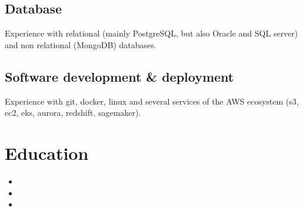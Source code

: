 \documentclass[11pt,a4paper,sans]{moderncv}        %
\begin{document}
\subsection{Database}
Experience with relational (mainly PostgreSQL, but also Oracle and SQL server) and non relational (MongoDB) databases.
\subsection{Software development \& deployment}
Experience with git, docker, linux and several services of the AWS ecosystem (s3, ec2, eks, aurora, redshift, sagemaker).

\section{Education}
\begin{itemize}
\item{}
\item{}
\item{}
\end{itemize}
\end{document}

